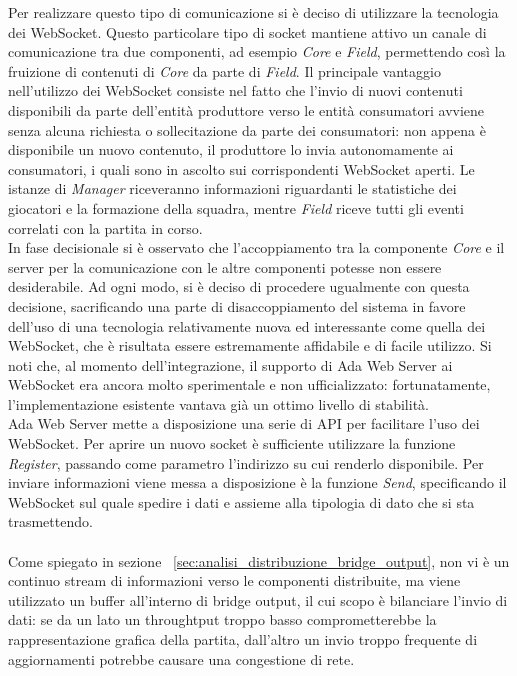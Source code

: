 \noindent Per realizzare questo tipo di comunicazione si è deciso di utilizzare la tecnologia dei WebSocket. Questo particolare tipo di socket mantiene attivo un canale di comunicazione tra due componenti, ad esempio \emph{Core} e \emph{Field}, permettendo così la fruizione di contenuti di \emph{Core} da parte di \emph{Field}. Il principale vantaggio nell'utilizzo dei WebSocket consiste nel fatto che l'invio di nuovi contenuti disponibili da parte dell'entità produttore verso le entità consumatori avviene senza alcuna richiesta o sollecitazione da parte dei consumatori: non appena è disponibile un nuovo contenuto, il produttore lo invia autonomamente ai consumatori, i quali sono in ascolto sui corrispondenti WebSocket aperti. Le istanze di \emph{Manager} riceveranno informazioni riguardanti le statistiche dei giocatori e la formazione della squadra, mentre \emph{Field} riceve tutti gli eventi correlati con la partita in corso.\\

In fase decisionale si è osservato che l'accoppiamento tra la componente \emph{Core} e il server per la comunicazione con le altre componenti potesse non essere desiderabile. Ad ogni modo, si è deciso di procedere ugualmente con questa decisione, sacrificando una parte di disaccoppiamento del sistema in favore dell'uso di una tecnologia relativamente nuova ed interessante come quella dei WebSocket, che è risultata essere estremamente affidabile e di facile utilizzo. Si noti che, al momento dell'integrazione, il supporto di Ada Web Server ai WebSocket era ancora molto sperimentale e non ufficializzato: fortunatamente, l'implementazione esistente vantava già un ottimo livello di stabilità.\\

Ada Web Server mette a disposizione una serie di API per facilitare l'uso dei WebSocket. Per aprire un nuovo socket è sufficiente utilizzare la funzione \emph{Register}, passando come parametro l'indirizzo su cui renderlo disponibile. Per inviare informazioni viene messa a disposizione è la funzione \emph{Send}, specificando il WebSocket sul quale spedire i dati e assieme alla tipologia di dato che si sta trasmettendo.\\\\

Come spiegato in sezione ~\ref{sec:analisi_distribuzione_bridge_output}, non vi è un continuo stream di informazioni verso le componenti distribuite, ma viene utilizzato un buffer all'interno di bridge output, il cui scopo è bilanciare l'invio di dati: se da un lato un throughtput troppo basso comprometterebbe la rappresentazione grafica della partita, dall'altro un invio troppo frequente di aggiornamenti potrebbe causare una congestione di rete.

